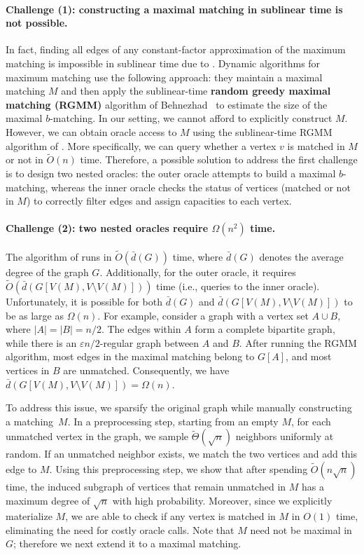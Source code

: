 \documentclass[letterpaper,11pt]{article}
\renewcommand{\epsilon}{\varepsilon}
\newcommand{\wt}[1]{\ensuremath{\widetilde{#1}}}
\begin{document}
\paragraph{Challenge (1): constructing a maximal matching in sublinear time is not possible.} In fact, finding all edges of any constant-factor approximation of the maximum matching is impossible in sublinear time due to \cite{ParnasRon07}. Dynamic algorithms for maximum matching \cite{Behnezhad23, BhattacharyaKSW23} use the following approach: they maintain a maximal matching $M$ and then apply the sublinear-time \textbf{random greedy maximal matching (RGMM)} algorithm of Behnezhad~\cite{Behnezhad21} to estimate the size of the maximal $b$-matching. In our setting, we cannot afford to explicitly construct $M$. However, we can obtain oracle access to $M$ using the sublinear-time RGMM algorithm of \cite{Behnezhad21}. More specifically, we can query whether a vertex $v$ is matched in $M$ or not in $\wt{O}(n)$ time. Therefore, a possible solution to address the first challenge is to design two nested oracles: the outer oracle attempts to build a maximal $b$-matching, whereas the inner oracle checks the status of vertices (matched or not in $M$) to correctly filter edges and assign capacities to each vertex.


\paragraph{Challenge (2): two nested oracles require $\Omega(n^2)$ time.} The algorithm of \cite{Behnezhad21} runs in $\wt{O}(\bar{d}(G))$ time, where $\bar{d}(G)$ denotes the average degree of the graph $G$. Additionally, for the outer oracle, it requires $\wt{O}(\bar{d}(G[V(M), V \setminus V(M)]))$ time (i.e., queries to the inner oracle). Unfortunately, it is possible for both $\bar{d}(G)$ and $\bar{d}(G[V(M), V \setminus V(M)])$ to be as large as $\Omega(n)$.  For example, consider a graph with a vertex set $A \cup B$, where $|A| = |B| = n/2$. The edges within $A$ form a complete bipartite graph, while there is an $\epsilon n/2$-regular graph between $A$ and $B$. After running the RGMM algorithm, most edges in the maximal matching belong to $G[A]$, and most vertices in $B$ are unmatched. Consequently, we have $\bar{d}(G[V(M), V \setminus V(M)]) = \Omega(n)$. 

To address this issue, we sparsify the original graph while manually constructing a matching~$M$. In a preprocessing step, starting from an empty $M$, for each unmatched vertex in the graph, we sample $\wt{\Theta}(\sqrt{n})$ neighbors uniformly at random. If an unmatched neighbor exists, we match the two vertices and add this edge to $M$.  Using this preprocessing step, we show that after spending $\wt{O}(n\sqrt{n})$ time, the induced subgraph of vertices that remain unmatched in $M$ has a maximum degree of $\sqrt{n}$ with high probability. Moreover,
since we explicitly materialize $M$,
we are able to check if any vertex is matched in $M$ in $O(1)$ time, eliminating the need for costly oracle calls.
Note that $M$ need not be maximal in $G$; therefore we next extend it to a maximal matching.
\end{document}
